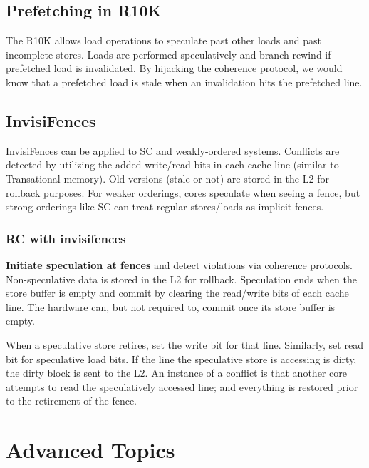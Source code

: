 \documentclass{article}
\begin{document}
\begin{multicols*}{2}
\subsection{Prefetching in R10K}
The R10K allows load operations to speculate past other loads and past incomplete stores. Loads are performed speculatively and branch rewind if prefetched load is invalidated. By hijacking the coherence protocol, we would know that a prefetched load is stale when an invalidation hits the prefetched line.

\subsection{InvisiFences}
InvisiFences can be applied to SC and weakly-ordered systems. Conflicts are detected by utilizing the added write/read bits in each cache line (similar to Transational memory). Old versions (stale or not) are stored in the L2 for rollback purposes. For weaker orderings, cores speculate when seeing a fence, but strong orderings like SC can treat regular stores/loads as implicit fences.

\subsubsection{RC with invisifences}
\textbf{Initiate speculation at fences} and detect violations via coherence protocols. Non-speculative data is stored in the L2 for rollback. Speculation ends when the store buffer is empty and commit by clearing the read/write bits of each cache line. The hardware can, but not required to, commit once its store buffer is empty.

\noindent\newline
When a speculative store retires, set the write bit for that line. Similarly, set read bit for speculative load bits. If the line the speculative store is accessing is dirty, the dirty block is sent to the L2. An instance of a conflict is that another core attempts to read the speculatively accessed line; and everything is restored prior to the retirement of the fence.

\section{Advanced Topics}


\end{multicols*}
\end{document}
